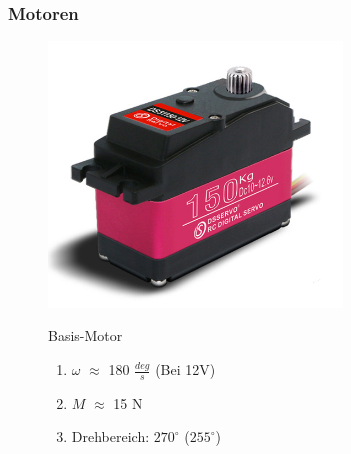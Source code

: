\documentclass[aspectratio=169]{beamer}
\begin{document}
\begin{frame}
	\frametitle{Motoren}
	\begin{figure}[h]
		\begin{minipage}[c]{.46\linewidth}
			\centering
			\includegraphics[height = 200pt]{../resources/BaseServo.jpg}
		\end{minipage}
		\hfill%
		\begin{minipage}[c]{.46\linewidth}
			\begin{block}{Basis-Motor}
				\begin{enumerate}
					\item $\omega$ $\approx$ 180 $\frac{deg}{s}$ (Bei 12$\si{\volt}$)
					\item $M$ $\approx$ 15 $\si{\newton}$
					\item Drehbereich: $270^\circ$ ($255^\circ$)
				\end{enumerate}
			\end{block}
		\end{minipage}
	\end{figure}
\end{frame}
\end{document}
